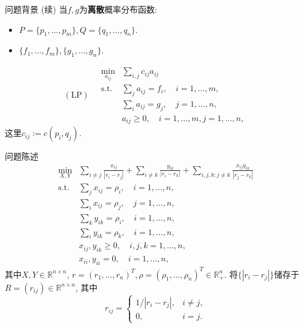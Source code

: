 \documentclass{beamer}
\newcommand{\st}{\mathrm{s.t.}}
\begin{document}
\begin{frame}{问题背景 (续)}
	当$f,g$为\textbf{离散}概率分布函数:
	\begin{itemize}
	\item $P=\{p_1,\ldots,p_m\},Q=\{q_1,\ldots,q_n\}$.
	\item $\{f_1,\ldots,f_m\},\{g_1,\ldots,g_n\}$.
	\end{itemize}\vspace{4mm}
	$$\mathrm{(LP)}\quad\begin{array}{rl}
		\min\limits_{a_{ij}} & \sum\limits_{i,j}c_{ij}a_{ij}\\
		\st & \sum\limits_ja_{ij}=f_i,\quad i=1,\ldots,m,\\
		 & \sum\limits_ia_{ij}=g_j,\quad j=1,\ldots,n,\\
		 & a_{ij}\ge0,\quad i=1,\ldots,m,j=1,\ldots,n,
	\end{array}$$
	这里$c_{ij}:=c(p_i,q_j)$.
\end{frame}

\begin{frame}{问题陈述}
	\begin{equation}
		\begin{array}{rl}
			\min\limits_{X,Y} & \sum\limits_{i\ne j}\frac{x_{ij}}{|r_i-r_j|}+\sum\limits_{i\ne k}\frac{y_{ik}}{|r_i-r_k|}+\sum\limits_{i,j,k:j\ne k}\frac{x_{ij}y_{ik}}{|r_j-r_k|}\\
			\st & \sum\limits_jx_{ij}=\rho_i,\quad i=1,\ldots,n,\\
			 & \sum\limits_ix_{ij}=\rho_j,\quad j=1,\ldots,n,\\
			 & \sum\limits_ky_{ik}=\rho_i,\quad i=1,\ldots,n,\\
			 & \sum\limits_iy_{ik}=\rho_k,\quad i=1,\ldots,n,\\
			 & x_{ij},y_{ik}\ge0,\quad i,j,k=1,\ldots,n,\\
			 & x_{ii},y_{ii}=0,\quad i=1,\ldots,n,
		\end{array}
		\label{original problem element form}
	\end{equation}
	其中$X,Y\in\mathbb{R}^{n\times n}$, $r=(r_1,\ldots,r_n)^T,\rho=(\rho_1,\ldots,\rho_n)^T\in\mathbb{R}_+^n$. 将$\{|r_i-r_j|\}$储存于$R=(r_{ij})\in\mathbb{R}^{n\times n}$, 其中
	$$r_{ij}=\left\{\begin{array}{ll}
		1/|r_i-r_j|, & i\ne j,\\
		0, & i=j.
	\end{array}\right.$$
\end{frame}
\end{document}
